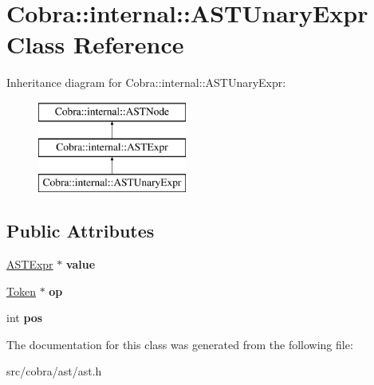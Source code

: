 \hypertarget{class_cobra_1_1internal_1_1_a_s_t_unary_expr}{\section{Cobra\+:\+:internal\+:\+:A\+S\+T\+Unary\+Expr Class Reference}
\label{class_cobra_1_1internal_1_1_a_s_t_unary_expr}
}
Inheritance diagram for Cobra\+:\+:internal\+:\+:A\+S\+T\+Unary\+Expr\+:\begin{figure}[H]
\begin{center}
\leavevmode
\includegraphics[height=3.000000cm]{class_cobra_1_1internal_1_1_a_s_t_unary_expr}
\end{center}
\end{figure}
\subsection*{Public Attributes}
\begin{DoxyCompactItemize}
\item 
\hypertarget{class_cobra_1_1internal_1_1_a_s_t_unary_expr_a42f025f4ad5154da2e8443c93b4503b6}{\hyperlink{class_cobra_1_1internal_1_1_a_s_t_expr}{A\+S\+T\+Expr} $\ast$ {\bfseries value}}\label{class_cobra_1_1internal_1_1_a_s_t_unary_expr_a42f025f4ad5154da2e8443c93b4503b6}

\item 
\hypertarget{class_cobra_1_1internal_1_1_a_s_t_unary_expr_aa284a1dd2bb9b1d09242957f322fa780}{\hyperlink{class_cobra_1_1internal_1_1_token}{Token} $\ast$ {\bfseries op}}\label{class_cobra_1_1internal_1_1_a_s_t_unary_expr_aa284a1dd2bb9b1d09242957f322fa780}

\item 
\hypertarget{class_cobra_1_1internal_1_1_a_s_t_unary_expr_aa7e66ada18fdc5b342f7b051261fde5c}{int {\bfseries pos}}\label{class_cobra_1_1internal_1_1_a_s_t_unary_expr_aa7e66ada18fdc5b342f7b051261fde5c}

\end{DoxyCompactItemize}


The documentation for this class was generated from the following file\+:\begin{DoxyCompactItemize}
\item 
src/cobra/ast/ast.\+h\end{DoxyCompactItemize}
